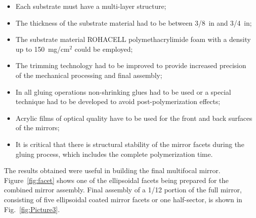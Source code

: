 \begin{itemize}
    \item Each substrate must have a multi-layer structure;
    \item The thickness of the substrate material had to be between 3/8~in and 3/4~in;
    \item The substrate material ROHACELL polymethacrylimide foam with a density up to 150~mg/cm$^2$ could be
      employed;
    \item The trimming technology had to be improved to provide increased precision of the mechanical processing and
      final assembly;
    \item In all gluing operations non-shrinking glues had to be used or a special technique had to be developed to avoid
      post-polymerization effects;
    \item Acrylic films of optical quality have to be used for the front and back surfaces of the mirrors;
    \item It is critical that there is structural stability of the mirror facets during the gluing process, which includes
      the complete polymerization time.
    \end{itemize}

The results obtained were useful in building the final multifocal mirror. Figure~\ref{fig:facet} shows one of the
ellipsoidal facets being prepared for the combined mirror assembly. Final assembly of a 1/12 portion of the full
mirror, consisting of five ellipsoidal coated mirror facets or one half-sector, is shown in Fig.~\ref{fig:Picture3}.

